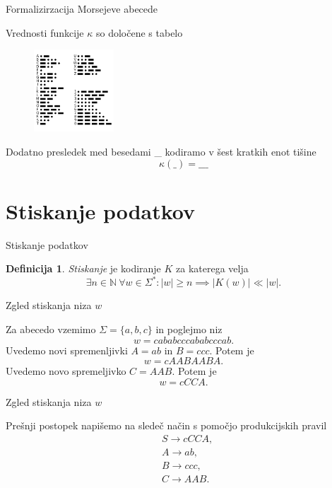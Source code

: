 \documentclass{beamer}
\newcommand{\N}{\mathbb{N}}
\theoremstyle{definition} %
\newtheorem{definicija}{Definicija}[section]
\theoremstyle{plain} %
\begin{document}
\begin{frame}{Formalizirzacija Morsejeve abecede}
    
    Vrednosti funkcije $ \kappa $ so določene s
    tabelo
    \begin{figure}[h]
        \centering
        \includegraphics[width=3cm]{International_Morse_Code.svg.png}
    \end{figure}
    Dodatno presledek med besedami \_  kodiramo v šest kratkih enot tišine 
    \[
        \kappa(\_) = \_\_\_
    \]

\end{frame}

\section*{Stiskanje podatkov}

\begin{frame}{Stiskanje podatkov}
    
    \begin{definicija}
    
        \textit{Stiskanje} je kodiranje $ K $ za katerega velja 
        \[ 
        \exists n \in \N \ \forall w \in \Sigma^* \colon |w| \geq n \implies
        \left\lvert K(w)\right\rvert \ll \left\lvert w \right\rvert.
        \]
    
    \end{definicija}

\end{frame}

\begin{frame}{Zgled stiskanja niza $ w $}

    Za abecedo vzemimo $ \Sigma = \{ a,b,c \} $ in poglejmo niz
    \[
        w = cababcccababcccab.
    \]
    \pause
    Uvedemo novi spremenljivki $ A = ab $ in $ B = ccc $.
    \pause
    Potem je
    \[
        w = cAABAABA.
    \]
    \pause
    Uvedemo novo spremeljivko $ C = AAB $.
    \pause
    Potem je    
    \[
        w = cCCA.
    \]

\end{frame}

\begin{frame}{Zgled stiskanja niza $ w $}
    
    Prešnji postopek napišemo na sledeč način s pomočjo produkcijskih pravil
    \begin{align*}
        & S  \rightarrow  cCCA, \\
        & A  \rightarrow  ab, \\
        & B  \rightarrow  ccc, \\
        & C  \rightarrow  AAB.
    \end{align*}

\end{frame}
\end{document}
